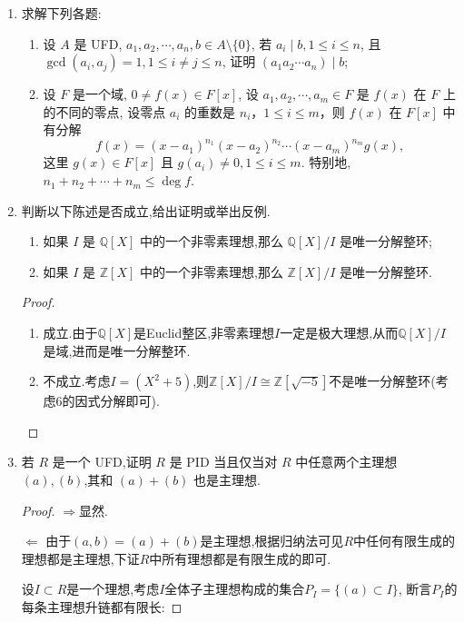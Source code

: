 \begin{enumerate}
\item 求解下列各题:
\begin{enumerate}[label=(\arabic*)]
    \item 设 $ A $ 是 UFD, $ a_1, a_2, \cdots, a_n, b \in A \setminus \{0\} $, 
    若 $ a_i \mid b, 1 \leqslant i \leqslant n $, 
    且 $ \gcd(a_i, a_j) = 1, 1 \leqslant i \neq j \leqslant n $, 
    证明 $ (a_1 a_2 \cdots a_n) \mid b $;
    \item 设 $ F $ 是一个域, $ 0 \neq f(x) \in F[x] $, 设 $ a_1, a_2, \cdots, a_m \in F $ 是 $ f(x) $ 在 $ F $ 上的不同的零点, 
    设零点 $ a_i $ 的重数是 $n_i$，$1 \leqslant i \leqslant m$，则 $ f(x) $ 在 $ F[x] $ 中有分解
    \[
    f(x) = (x - a_1)^{n_1} (x - a_2)^{n_2} \cdots (x - a_m)^{n_m} g(x),
    \]
    这里 $ g(x) \in F[x] $ 且 $ g(a_i) \neq 0, 1 \leqslant i \leqslant m $.
    特别地, $ n_1 + n_2 + \cdots + n_m \leqslant \deg f $.
\end{enumerate}

\item 判断以下陈述是否成立,给出证明或举出反例.
\begin{enumerate}[label=(\arabic*)]
    \item 如果 $ I $ 是 $ \mathbb{Q}[X] $ 中的一个非零素理想,那么 $ \mathbb{Q}[X]/I $ 是唯一分解整环;
    \item 如果 $ I $ 是 $ \mathbb{Z}[X] $ 中的一个非零素理想,那么 $ \mathbb{Z}[X]/I $ 是唯一分解整环.
\end{enumerate}
\begin{proof}
    \begin{enumerate}[label=(\arabic*)]
        \item 成立.由于$\mathbb{Q}[X]$是Euclid整区,非零素理想$I$一定是极大理想,从而$\mathbb{Q}[X]/I$是域,进而是唯一分解整环.
        \item 不成立.考虑$I=(X^2+5)$,则$\mathbb{Z}[X]/I \cong \mathbb{Z}[\sqrt{-5}]$不是唯一分解整环(考虑$6$的因式分解即可).\qedhere
    \end{enumerate}
\end{proof}

\item 若 $ R $ 是一个 UFD,证明 $ R $ 是 PID 当且仅当对 $ R $ 中任意两个主理想 $(a), (b)$,其和 $(a) + (b)$ 也是主理想.
\begin{proof}
    $\Rightarrow$显然.

    $\Leftarrow$ 由于$(a,b)=(a)+(b)$是主理想,根据归纳法可见$R$中任何有限生成的理想都是主理想,下证$R$中所有理想都是有限生成的即可.

    设$I\subset R$是一个理想,考虑$I$全体子主理想构成的集合$P_I=\{(a)\subset I\}$,
    断言$P_I$的每条主理想升链都有限长:
    

\end{proof}
\end{enumerate}
